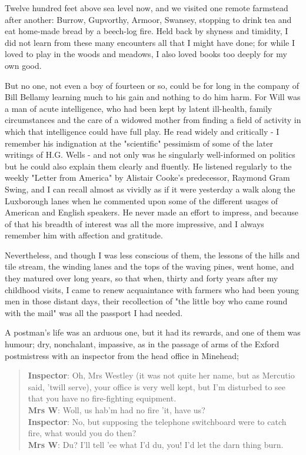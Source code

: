 Twelve hundred feet above sea level now, and we visited one remote farmstead after another: Burrow, Gupvorthy, Armoor, Swansey, stopping to drink tea and eat home-made bread by a beech-log fire. Held back by shyness and timidity, I did not learn from these many encounters all that I might have done; for while I loved to play in the woods and meadows, I also loved books too deeply for my own good.

But no one, not even a boy of fourteen or so, could be for long in the company of Bill Bellamy learning much to his gain and nothing to do him harm. For Will was a man of acute intelligence, who had been kept by latent ill-health, family circumstances and the care of a widowed mother from finding a field of activity in which that intelligence could have full play. He read widely and critically - I remember his indignation at the "scientific" pessimism of some of the later writings of H.G. Wells - and not only was he singularly well-informed on politics but he could also explain them clearly and fluently. He listened regularly to the weekly "Letter from America" by Alistair Cooke's predecessor, Raymond Gram Swing, and I can recall almost as vividly as if it were yesterday a walk along the Luxborough lanes when he commented upon some of the different usages of American and English speakers. He never made an effort to impress, and because of that his breadth of interest was all the more impressive, and I always remember him with affection and gratitude.

Nevertheless, and though I was less conscious of them, the lessons of the hills and tile stream, the winding lanes and the tops of the waving pines, went home, and they matured over long years, so that when, thirty and forty years after my childhood visits, I came to renew acquaintance with farmers who had been young men in those distant days, their recollection of "the little boy who came round with the mail" was all the passport I had needed.

A postman's life was an arduous one, but it had its rewards, and one of them was humour; dry, nonchalant, impassive, as in the passage of arms of the Exford postmistress with an inspector from the head office in Minehead;

\begin{quotation}
\textbf{Inspector}: Oh, Mrs Westley (it was not quite her name, but as Mercutio said, 'twill serve), your office is very well kept, but I'm disturbed to see that you have no fire-fighting equipment. \\
\textbf{Mrs W}: Woll, us hab'm had no fire 'it, have us? \\
\textbf{Inspector}: No, but supposing the telephone switchboard were to catch fire, what would you do then? \\
\textbf{Mrs W}: Du? I'll tell 'ee what I'd du, you! I'd let the darn thing burn. \\
\end{quotation}

